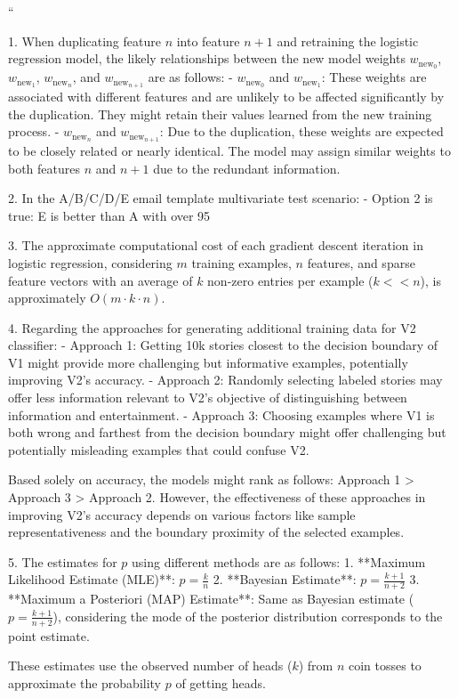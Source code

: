 ``

1. When duplicating feature \(n\) into feature \(n+1\) and retraining the logistic regression model, the likely relationships between the new model weights \(w_{\text{new}_0}\), \(w_{\text{new}_1}\), \(w_{\text{new}_n}\), and \(w_{\text{new}_{n+1}}\) are as follows:
    - \(w_{\text{new}_0}\) and \(w_{\text{new}_1}\): These weights are associated with different features and are unlikely to be affected significantly by the duplication. They might retain their values learned from the new training process.
    - \(w_{\text{new}_n}\) and \(w_{\text{new}_{n+1}}\): Due to the duplication, these weights are expected to be closely related or nearly identical. The model may assign similar weights to both features \(n\) and \(n+1\) due to the redundant information.

2. In the A/B/C/D/E email template multivariate test scenario:
    - Option 2 is true: E is better than A with over 95%
    
3. The approximate computational cost of each gradient descent iteration in logistic regression, considering \(m\) training examples, \(n\) features, and sparse feature vectors with an average of \(k\) non-zero entries per example (\(k << n\)), is approximately \(O(m \cdot k \cdot n)\).

4. Regarding the approaches for generating additional training data for V2 classifier:
    - Approach 1: Getting 10k stories closest to the decision boundary of V1 might provide more challenging but informative examples, potentially improving V2's accuracy.
    - Approach 2: Randomly selecting labeled stories may offer less information relevant to V2's objective of distinguishing between information and entertainment.
    - Approach 3: Choosing examples where V1 is both wrong and farthest from the decision boundary might offer challenging but potentially misleading examples that could confuse V2.

    Based solely on accuracy, the models might rank as follows: Approach 1 > Approach 3 > Approach 2. However, the effectiveness of these approaches in improving V2's accuracy depends on various factors like sample representativeness and the boundary proximity of the selected examples.

5. The estimates for \(p\) using different methods are as follows:
    1. **Maximum Likelihood Estimate (MLE)**: \(p = \frac{k}{n}\)
    2. **Bayesian Estimate**: \(p = \frac{k+1}{n+2}\)
    3. **Maximum a Posteriori (MAP) Estimate**: Same as Bayesian estimate (\(p = \frac{k+1}{n+2}\)), considering the mode of the posterior distribution corresponds to the point estimate.

These estimates use the observed number of heads (\(k\)) from \(n\) coin tosses to approximate the probability \(p\) of getting heads.

